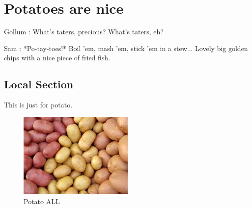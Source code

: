 \documentclass[../../../main.tex]{subfiles}
\begin{document}

\onlyonchapterfile{
}




\chapter{Potatoes are nice}


Gollum : What's taters, precious? What's taters, eh?

Sam : *Po-tay-toes!* Boil 'em, mash 'em, stick 'em in a stew... Lovely big golden chips with a nice piece of fried fish.

\lipsum[3-12]





\section{Local Section}

This is just for potato.

\begin{figure}[!htbp]
    \centering
    \includegraphics[width=0.5\textwidth]{./figures/potato_all.jpeg}
    \caption{Potato ALL}
    \label{fig:potato_all}
\end{figure}
\end{document}
